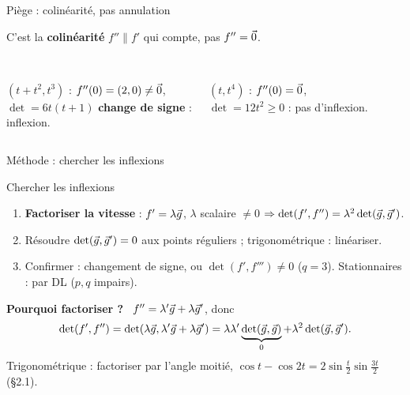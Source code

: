 \documentclass[aspectratio=169,11pt]{beamer}
\newcommand{\rep}[1]{\textcolor{Vert}{#1}}%
\begin{document}
\begin{frame}{Piège : colinéarité, pas annulation}
\begin{PIEGE}
C'est la \textbf{colinéarité} $f''\parallel f'$ qui compte, pas $f''=\vec{0}$.
\end{PIEGE}
\begin{columns}[T]
\centering
{}\\
$(t+t^2,t^3)$ : $f''(0)=(2,0)\neq\vec{0}$,\\ $\det=6t(t+1)$ \textbf{change de signe} :\\ \rep{inflexion}.
\centering
\pause
{}\\
$(t,t^4)$ : $f''(0)=\vec{0}$,\\ $\det=12t^2\geq0$ : \rep{pas d'inflexion}.
\end{columns}
\end{frame}

\begin{frame}{Méthode : chercher les inflexions}
\begin{METH}{Chercher les inflexions}
\begin{enumerate}
\item \textbf{Factoriser la vitesse} : $f'=\lambda\vec{g}$, $\lambda$ scalaire $\neq0$ $\Rightarrow\det(f',f'')=\lambda^2\det(\vec{g},\vec{g}')$.
\item Résoudre $\det(\vec{g},\vec{g}')=0$ aux points réguliers ; trigonométrique : linéariser.
\item Confirmer : changement de signe, ou $\det(f',f''')\neq0$ ($q=3$). Stationnaires : par DL ($p,q$ impairs).
\end{enumerate}
\end{METH}
\pause
\textbf{Pourquoi factoriser ?} \ $f''=\lambda'\vec{g}+\lambda\vec{g}'$, donc
\[\det(f',f'')=\det(\lambda\vec{g},\lambda'\vec{g}+\lambda\vec{g}')=\lambda\lambda'\underbrace{\det(\vec{g},\vec{g})}_{0}+\lambda^2\det(\vec{g},\vec{g}').\]
\pause
{\small Trigonométrique : factoriser par l'angle moitié, $\cos t-\cos2t=2\sin\frac t2\sin\frac{3t}2$ (§2.1).}
\end{frame}
\end{document}
